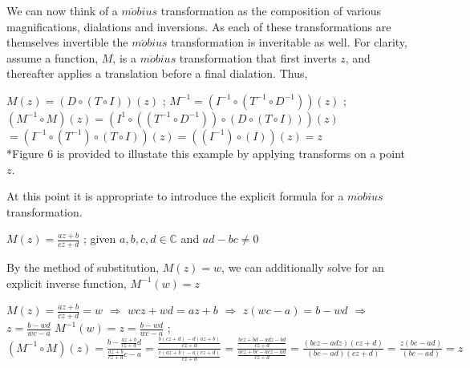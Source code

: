 \documentclass[a4paper,man,natbib]{apa6}
\newcommand{\C}{\mathbb{C}}  %
\begin{document}
We can now think of a $ m\ddot{o}bius $ transformation as the composition of various magnifications, dialations and inversions.
As each of these transformations are themselves invertible the $ m\ddot{o}bius $ transformation is inveritable as well. For clarity, assume a function, $ M $,
is a $ m\ddot{o}bius $ transformation that first inverts $ z $, and thereafter applies a translation before a final dialation. Thus,

\begin{center}

      $ M(z) = (D \circ (T \circ I))(z) $ ; $ M^{-1} = (I^{-1} \circ (T^{-1} \circ D^{-1}))(z) $ ; \\
      $ (M^{-1} \circ M)(z) = (I^{1} \circ ((T^{-1} \circ D^{-1})) \circ (D \circ (T \circ I)))(z) $ \\
      $ = (I^{-1} \circ (T^{-1}) \circ (T \circ I))(z) = ((I^{-1}) \circ (I))(z) = z $ \\
      *Figure 6 is provided to illustate this example by applying transforms on a point $ z $.

\end{center}

At this point it is appropriate to introduce the explicit formula for a $ m\ddot{o}bius $ transformation.

\begin{center}

      $ M(z) = \frac{az + b}{cz + d} $ ; given $ a,b,c,d \in \C $ and $ ad - bc \neq 0 $

\end{center}

By the method of substitution, $ M(z) = w $, we can additionally solve for an explicit inverse function, $ M^{-1}(w) = z $

\begin{center}

      $ M(z) = \frac{az + b}{cz + d} = w $ $ \Rightarrow $ $ wcz + wd = az + b $ $ \Rightarrow $ $ z(wc - a) = b - wd $ $ \Rightarrow $ $ z = \frac{b - wd}{wc - a} $
      $ M^{-1}(w) = z = \frac{b - wd}{wc - a} $ ; $ (M^{-1} \circ M)(z) = \frac{b - \frac{az + b}{cz + d}d}{\frac{az + b}{cz + d}c - a}
      = \frac{\frac{b(cz + d) - d(az + b)}{cz + d}}{\frac{c(az + b) - a(cz + d)}{cz + d}} = \frac{\frac{bcz + bd - adz - bd}{cz + d}}{\frac{acz + bc - acz - ad}{cz + d}}
      = \frac{(bcz - adz)(cz +d)}{(bc - ad)(cz + d)} = \frac{z(bc - ad)}{(bc - ad)} = z $

\end{center}
\end{document}
